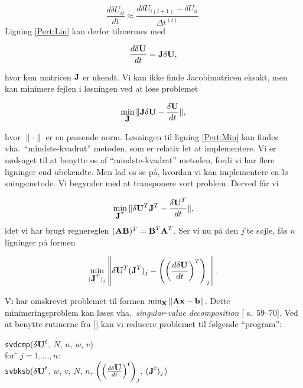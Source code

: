 \[
\frac{d\delta U_{il}}{dt} \approx \frac{d\delta U_{i(l+1)}-\delta
U_{il}}{\Delta t^{(l)}}.
\]
Ligning \ref{Pert:Lin} kan derfor tiln{\ae}rmes med 

\begin{equation}
\frac{d\delta \mbox{${\bf U}$}}{dt} = \mbox{${\bf J}$} \delta\mbox{${\bf U}$},
\end{equation}

hvor kun matricen $\mbox{${\bf J}$}$ er ukendt. Vi kan ikke finde
Jacobimatricen eksakt, men kan minimere fejlen i
l{\o}sningen ved at l{\o}se problemet

\begin{equation}
\label{Pert:Min}
  \min_{\mbox{${\bf J}$}} \|\mbox{${\bf J}$}\delta\mbox{${\bf U}$}-\frac{\delta\mbox{${\bf U}$}}{dt}\|,
\end{equation}

hvor $\|\cdot\|$ er en passende norm. L{\o}sningen til
ligning \ref{Pert:Min} kan findes vha.\ ``mindste-kvadrat''
metoden, som er relativ let at implementere. Vi er
n{\o}dsaget til at benytte os af ``mindste-kvadrat''
metoden, fordi vi har flere ligninger end ubekendte. Men
lad os se p{\aa}, hvordan vi kan implementere en l\o
sningsmetode. Vi begynder med at transponere vort problem.
Derved f{\aa}r vi

\begin{equation}
  \min_{\mbox{${\bf J}$}^T} \|\delta\mbox{${\bf U}$}^T\mbox{${\bf J}$}^T-\frac{\delta\mbox{${\bf U}$}^T}{dt}\|,
\end{equation}
idet vi har brugt regnereglen $(\mbox{${\bf A}$}\mbox{${\bf B}$})^T =
\mbox{${\bf B}$}^T\mbox{${\bf A}$}^T$. Ser vi nu p{\aa} den $j$'te s{\o}jle, f{\aa}s
$n$ ligninger p{\aa} formen

\begin{equation}
  \min_{(\mbox{${\bf J}$}^T)_j} \left\|\delta\mbox{${\bf U}$}^T(\mbox{${\bf J}$}^T)_j -
  \left(\left(\frac{d\delta\mbox{${\bf U}$}}{dt}\right)^T\right)_j \right\|.
\end{equation}

Vi har omskrevet problemet til formen
$\min_{\mbox{${\bf x}$}}\|\mbox{${\bf A}$}\mbox{${\bf x}$}-\mbox{${\bf b}$}\|$. Dette
minimeringsproblem kan l{\o}ses vha.\ {\em singular-value
decomposition} [ s.\ 59--70]. Ved at benytte
rutinerne fra [] kan vi reducere problemet
til f{\o}lgende ``program'':

\begin{tabbing}
{\tt svdcmp}($\delta\mbox{${\bf U}$}^t$, $N$, $n$, $w$, $v$) \\
for \= $j = 1,\ldots, n$:\\
\> {\tt svbksb}($\delta\mbox{${\bf U}$}^t$, $w$, $v$, $N$, $n$,
$\left(\left(\frac{d\delta\mbox{${\bf U}$}}{dt}\right)^t\right)_j$,
$(\mbox{${\bf J}$}^t)_j$)
\end{tabbing}


